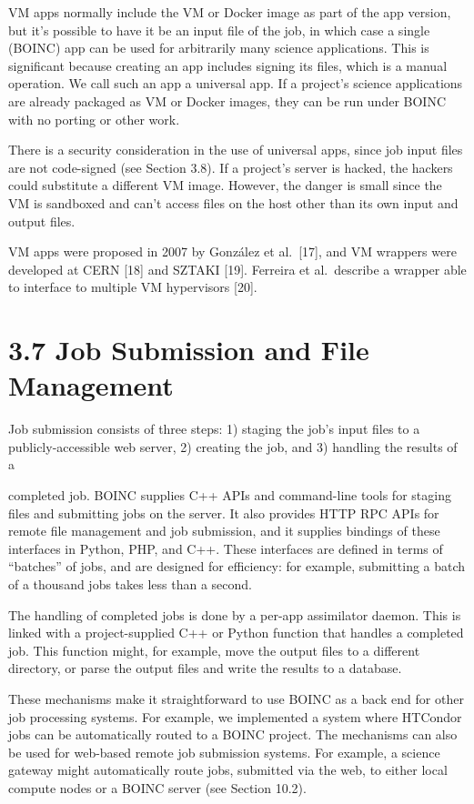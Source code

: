 \documentclass[
]{article}
\begin{document}
VM apps normally include the VM or Docker image as part of the app
version, but it's possible to have it be an input file of the job, in
which case a single (BOINC) app can be used for arbitrarily many science
applications. This is significant because creating an app includes
signing its files, which is a manual operation. We call such an app a
universal app. If a project's science applications are already packaged
as VM or Docker images, they can be run under BOINC with no porting or
other work.

There is a security consideration in the use of universal apps, since
job input files are not code-signed (see Section 3.8). If a project's
server is hacked, the hackers could substitute a different VM image.
However, the danger is small since the VM is sandboxed and can't access
files on the host other than its own input and output files.

VM apps were proposed in 2007 by González et al.~{[}17{]}, and VM
wrappers were developed at CERN {[}18{]} and SZTAKI {[}19{]}. Ferreira
et al.~describe a wrapper able to interface to multiple VM hypervisors
{[}20{]}.

\section{3.7 Job Submission and File
Management}\label{job-submission-and-file-management}

Job submission consists of three steps: 1) staging the job's input files
to a publicly-accessible web server, 2) creating the job, and 3)
handling the results of a

completed job. BOINC supplies C++ APIs and command-line tools for
staging files and submitting jobs on the server. It also provides HTTP
RPC APIs for remote file management and job submission, and it supplies
bindings of these interfaces in Python, PHP, and C++. These interfaces
are defined in terms of ``batches'' of jobs, and are designed for
efficiency: for example, submitting a batch of a thousand jobs takes
less than a second.

The handling of completed jobs is done by a per-app assimilator daemon.
This is linked with a project-supplied C++ or Python function that
handles a completed job. This function might, for example, move the
output files to a different directory, or parse the output files and
write the results to a database.

These mechanisms make it straightforward to use BOINC as a back end for
other job processing systems. For example, we implemented a system where
HTCondor jobs can be automatically routed to a BOINC project. The
mechanisms can also be used for web-based remote job submission systems.
For example, a science gateway might automatically route jobs, submitted
via the web, to either local compute nodes or a BOINC server (see
Section 10.2).
\end{document}
